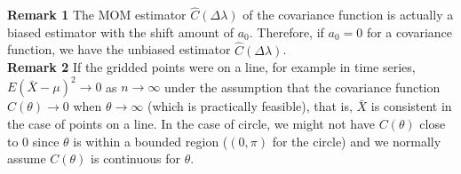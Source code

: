 % 
% 
% 
% 
% 
% 
% 





{\bf Remark 1} The MOM estimator $\hat{C}(\Delta \lambda)$ of the covariance function is actually a biased estimator with the shift amount of $a_0$. Therefore, if $a_0 = 0$ for a covariance function, we have the unbiased estimator $\hat{C}(\Delta \lambda)$. \\

{\bf Remark 2} If the gridded points were on a line, for example in time series, $E(\bar{X} - \mu)^2 \to 0$ as $n \to \infty$ under the assumption that the covariance function $C(\theta) \to 0$ when $\theta \to \infty$ (which is practically feasible), that is, $\bar{X}$ is consistent in the case of points on a line. In the case of circle, we might not have $C(\theta)$ close to 0 since $\theta$ is within a bounded region ($(0, \pi)$ for the circle) and we normally assume $C(\theta)$ is continuous for $\theta$. \\


